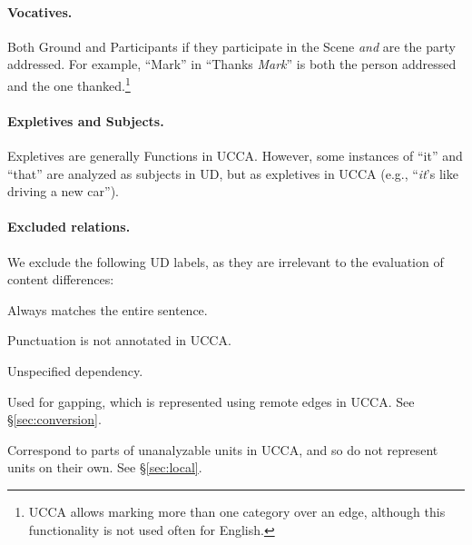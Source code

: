 \documentclass[11pt,a4paper]{article}
\begin{document}
\paragraph{Vocatives.}
    Both Ground and Participants if they participate in the Scene \textit{and} are the party addressed.
    For example, ``Mark'' in ``Thanks \textit{Mark}'' is both the person addressed and the one thanked.\footnote{UCCA allows marking more than one category over an edge, although this
    functionality is not used often for English.}
    
\paragraph{Expletives and Subjects.}
    Expletives are generally Functions in UCCA.
    However, some instances of ``it'' and ``that'' are analyzed as subjects in UD,
    but as expletives in UCCA (e.g., ``\textit{it}'s like driving a new car'').    

\paragraph{Excluded relations.}
We exclude the following UD labels,
as they are irrelevant to the evaluation of content differences:

\begin{description}
\setlength{\itemsep}{0pt}
  \item[\texttt{root}.] Always matches the entire sentence.
  \item[\texttt{punct}.] Punctuation is not annotated in UCCA.
  \item[\texttt{dep}.] Unspecified dependency.
  \item[\texttt{orphan}.] Used for gapping, which is represented using remote edges in UCCA. See \S\ref{sec:conversion}.
  \item[\texttt{fixed}, \texttt{flat} and \texttt{goeswith}.] Correspond to parts of unanalyzable units in UCCA,
    and so do not represent units on their own. See \S\ref{sec:local}.
\end{description}




\end{document}
